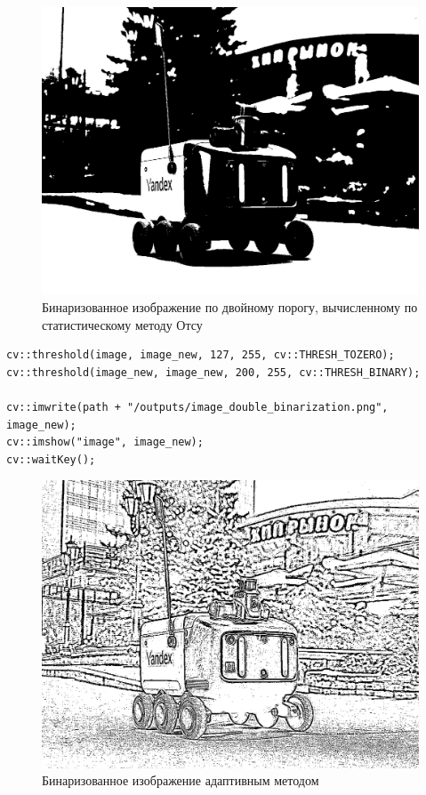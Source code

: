 \begin{figure}[ht]
    \includegraphics[width=\textwidth]{../outputs/image_otsu_binarization.png}
    \caption{Бинаризованное изображение по двойному порогу, вычисленному по статистическому методу Отсу}
    \label{fig:р}
\end{figure}

\pagebreak

\begin{lstlisting}[style=cpp_white, caption={Исходный код для адаптивной бинаризации}]
cv::threshold(image, image_new, 127, 255, cv::THRESH_TOZERO);
cv::threshold(image_new, image_new, 200, 255, cv::THRESH_BINARY);

cv::imwrite(path + "/outputs/image_double_binarization.png", image_new);
cv::imshow("image", image_new);
cv::waitKey();
\end{lstlisting}

\begin{figure}[ht]
    \includegraphics[width=\textwidth]{../outputs/image_adaptive_binarization.png}
    \caption{Бинаризованное изображение адаптивным методом}
    \label{fig:р}
\end{figure}

